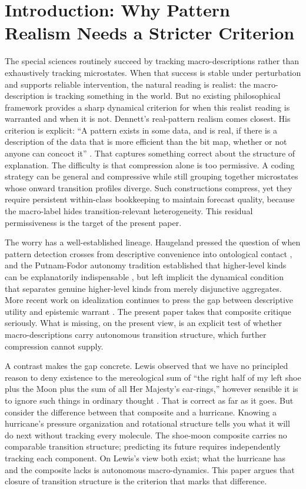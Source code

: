 \section{Introduction: Why Pattern Realism Needs a Stricter
  Criterion}\label{introduction-why-pattern-realism-needs-a-stricter-criterion}

The special sciences routinely succeed by tracking macro-descriptions
rather than exhaustively tracking microstates. When that success is
stable under perturbation and supports reliable intervention, the
natural reading is realist: the macro-description is tracking
something in the world. But no existing philosophical framework
provides a sharp dynamical criterion for when this realist reading is warranted
and when it is not. Dennett's real-pattern realism comes closest.
His criterion is explicit: ``A pattern exists in some data, and is
real, if there is a description of the data that is more efficient
than the bit map, whether or not anyone can concoct it''
\citep[p. 34]{dennett1991}. That captures something correct about the
structure of explanation. The difficulty is that compression alone is
too permissive. A coding strategy can be general and
compressive while still grouping together microstates whose onward
transition profiles diverge. Such constructions compress, yet they
require persistent within-class bookkeeping to maintain forecast
quality, because the macro-label hides transition-relevant
heterogeneity. This residual permissiveness is the target of the
present paper.

The worry has a well-established lineage. Haugeland pressed the
question of when pattern detection crosses from descriptive
convenience into ontological contact \citep{haugeland1998},
and the Putnam-Fodor autonomy tradition established that higher-level
kinds can be explanatorily indispensable \citep{putnam1967,fodor1974},
but left implicit the dynamical condition that separates genuine higher-level kinds from merely disjunctive aggregates. More recent
work on idealization continues to press the gap between descriptive
utility and epistemic warrant \citep[chap.~2]{elgin2017}. The present
paper takes that composite critique seriously. What is missing, on the present view, is an explicit test of whether macro-descriptions carry
autonomous transition structure, which further compression cannot
supply.

A contrast makes the gap concrete. Lewis observed that we have no
principled reason to deny existence to the mereological sum of ``the
right half of my left shoe plus the Moon plus the sum of all Her
Majesty's ear-rings,'' however sensible it is to ignore such things in
ordinary thought \citep[p. 213]{lewis1986}. That is correct as far as it
goes. But consider the difference between that composite and a
hurricane. Knowing a hurricane's pressure organization and rotational
structure tells you what it will do next without tracking every
molecule. The shoe-moon composite carries no comparable transition
structure; predicting its future requires independently tracking each
component. On Lewis's view both exist; what the hurricane has and
the composite lacks is autonomous macro-dynamics. This paper argues that closure of transition structure
is the criterion that marks that difference.

